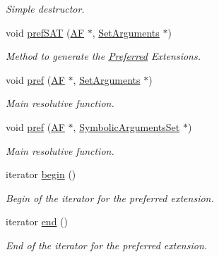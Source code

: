 \begin{DoxyCompactItemize}
\begin{DoxyCompactList}\small\item\em Simple destructor. \end{DoxyCompactList}\item 
void \hyperlink{classPreferred_a934eaa21aa97fc2e50a74a2f77a9ba33}{pref\-S\-A\-T} (\hyperlink{classAF}{A\-F} $\ast$, \hyperlink{classSetArguments}{Set\-Arguments} $\ast$)
\begin{DoxyCompactList}\small\item\em Method to generate the \hyperlink{classPreferred}{Preferred} Extensions. \end{DoxyCompactList}\item 
void \hyperlink{classPreferred_a9e9df230cf6e6f66462a622fcc0031c2}{pref} (\hyperlink{classAF}{A\-F} $\ast$, \hyperlink{classSetArguments}{Set\-Arguments} $\ast$)
\begin{DoxyCompactList}\small\item\em Main resolutive function. \end{DoxyCompactList}\item 
void \hyperlink{classPreferred_a176d69d511bc416e967cf41204a99ca0}{pref} (\hyperlink{classAF}{A\-F} $\ast$, \hyperlink{classSymbolicArgumentsSet}{Symbolic\-Arguments\-Set} $\ast$)
\begin{DoxyCompactList}\small\item\em Main resolutive function. \end{DoxyCompactList}\item 
iterator \hyperlink{classPreferred_a93ec882a74edb90e5852b2445312180a}{begin} ()
\begin{DoxyCompactList}\small\item\em Begin of the iterator for the preferred extension. \end{DoxyCompactList}\item 
iterator \hyperlink{classPreferred_a8966d2602ab8c81706b9b26cffe57b92}{end} ()
\begin{DoxyCompactList}\small\item\em End of the iterator for the preferred extension. \end{DoxyCompactList}\end{DoxyCompactItemize}
